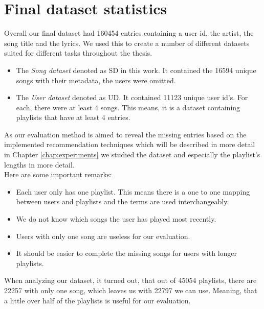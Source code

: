 \section{Final dataset statistics}
Overall our final dataset had 160454 entries containing a user id, the artist, the song title and the lyrics. We used this to create a number of different datasets suited for different tasks throughout the thesis. \\
\begin{itemize}
    \item The \textit{Song dataset} denoted as SD in this work. It contained the 16594 unique songs with their metadata, the users were omitted.
    \item The \textit{User dataset} denoted as UD. It contained 11123 unique user id's. For each, there were at least 4 songs. This means, it is a dataset containing playlists that have at least 4 entries. 
\end{itemize}
 As our evaluation method is aimed to reveal the missing entries based on the implemented recommendation techniques which will be described in more detail in Chapter \ref{chap:experiments} we studied the dataset and especially the playlist's lengths in more detail.\\
Here are some important remarks:
\begin{itemize}
    \item Each user only has one playlist. This means there is a one to one mapping between users and playlists and the terms are used interchangeably.
    \item We do not know which songs the user has played most recently.
    \item Users with only one song are useless for our evaluation.
    \item It should be easier to complete the missing songs for users with longer playlists.
\end{itemize} 
When analyzing our dataset, it turned out, that out of 45054 playlists, there are 22257 with only one song, which leaves us with 22797 we can use. Meaning, that a little over half of the playlists is useful for our evaluation.

